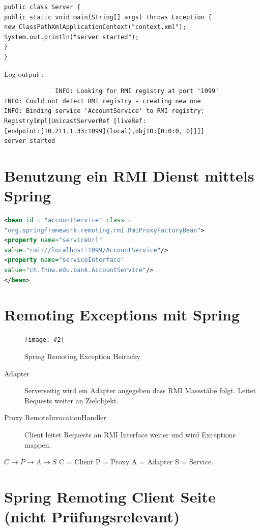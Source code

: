\documentclass[a4paper,10pt]{scrreprt}
\newcommand{\pic}[2][figure]{\begin{figure}[h]
 \centering
 \texttt{[image: \#2]}
 \caption{#1}
\end{figure}
}
\begin{document}
\begin{lstlisting}[caption=Server Code für RMI Export]
 public class Server {
public static void main(String[] args) throws Exception {
new ClassPathXmlApplicationContext("context.xml");
System.out.println("server started");
}
}

\end{lstlisting}
Log output : \begin{verbatim}
              INFO: Looking for RMI registry at port '1099'
INFO: Could not detect RMI registry - creating new one
INFO: Binding service 'AccountService' to RMI registry:
RegistryImpl[UnicastServerRef [liveRef:
[endpoint:[10.211.1.33:1099](local),objID:[0:0:0, 0]]]]
server started
             \end{verbatim}




\section{Benutzung ein RMI Dienst mittels Spring}
\begin{lstlisting}[caption=Spring config File : benutzung,language=xml]
 <bean id = "accountService" class =
"org.springframework.remoting.rmi.RmiProxyFactoryBean">
<property name="serviceUrl"
value="rmi://localhost:1099/AccountService"/>
<property name="serviceInterface"
value="ch.fhnw.edu.bank.AccountService"/>
</bean>
\end{lstlisting}

\section{Remoting Exceptions mit Spring}
\pic[Spring Remoting Exception Heirachy]{sreh.png}

\begin{description}
 \item [Adapter] Serverseitig wird ein Adapter angegeben dass RMI Massstäbe folgt. Leitet Requests weiter an Zielobjekt.
 \item [Proxy RemoteInvocationHandler] Client leitet Requests an RMI Interface weiter und wird Exceptions 
mappen.
\end{description}

$ C \rightarrow P \rightarrow A \rightarrow S$ C = Client P = Proxy A = Adapter S = Service.


\section{Spring Remoting Client Seite (nicht Prüfungsrelevant)}
\end{document}
